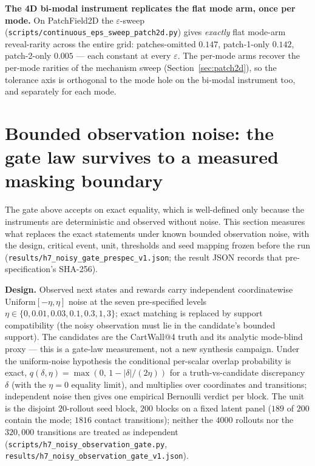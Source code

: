 \documentclass[11pt]{article}
\theoremstyle{definition}
\theoremstyle{remark}
\begin{document}
\textbf{The 4D bi-modal instrument replicates the flat mode arm, once per mode.} On PatchField2D the $\varepsilon$-sweep (\texttt{scripts/continuous\_eps\_sweep\_patch2d.py}) gives \emph{exactly} flat mode-arm reveal-rarity across the entire grid: patches-omitted $0.147$, patch-1-only $0.142$, patch-2-only $0.005$ --- each constant at every $\varepsilon$. The per-mode arms recover the per-mode rarities of the mechanism sweep (Section~\ref{sec:patch2d}), so the tolerance axis is orthogonal to the mode hole on the bi-modal instrument too, and separately for each mode.


\section{Bounded observation noise: the gate law survives to a measured masking boundary}
\label{sup:noisygate}

The gate above accepts on exact equality, which is well-defined only because the instruments are deterministic and observed without noise. This section measures what replaces the exact statements under known bounded observation noise, with the design, critical event, unit, thresholds and seed mapping frozen before the run (\texttt{results/\allowbreak h7\_\allowbreak noisy\_\allowbreak gate\_\allowbreak prespec\_\allowbreak v1.json}; the result JSON records that pre-specification's SHA-256).

\textbf{Design.} Observed next states and rewards carry independent coordinatewise $\mathrm{Uniform}[-\eta,\eta]$ noise at the seven pre-specified levels $\eta \in \{0, 0.01, 0.03, 0.1, 0.3, 1, 3\}$; exact matching is replaced by support compatibility (the noisy observation must lie in the candidate's bounded support). The candidates are the CartWall@4 truth and its analytic mode-blind proxy --- this is a gate-law measurement, not a new synthesis campaign. Under the uniform-noise hypothesis the conditional per-scalar overlap probability is exact, $q(\delta,\eta) = \max(0,\, 1 - |\delta|/(2\eta))$ for a truth-vs-candidate discrepancy $\delta$ (with the $\eta = 0$ equality limit), and multiplies over coordinates and transitions; independent noise then gives one empirical Bernoulli verdict per block. The unit is the disjoint $20$-rollout seed block, $200$ blocks on a fixed latent panel ($189$ of $200$ contain the mode; $1816$ contact transitions); neither the $4000$ rollouts nor the $320{,}000$ transitions are treated as independent (\texttt{scripts/\allowbreak h7\_\allowbreak noisy\_\allowbreak observation\_\allowbreak gate.py}, \texttt{results/\allowbreak h7\_\allowbreak noisy\_\allowbreak observation\_\allowbreak gate\_\allowbreak v1.json}).
\end{document}
